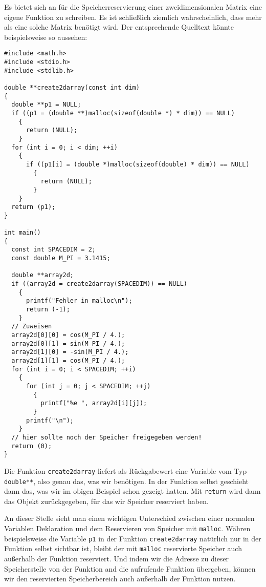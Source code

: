 Es bietet sich an für die Speicherreservierung einer zweidimensionalen Matrix eine eigene Funktion zu schreiben.
Es ist schließlich ziemlich wahrscheinlich, dass mehr als eine solche Matrix benötigt wird.
Der entsprechende Quelltext könnte beispielsweise so aussehen:
\begin{lstlisting}
#include <math.h>
#include <stdio.h>
#include <stdlib.h>

double **create2darray(const int dim)
{
  double **p1 = NULL;
  if ((p1 = (double **)malloc(sizeof(double *) * dim)) == NULL)
    {
      return (NULL);
    }
  for (int i = 0; i < dim; ++i)
    {
      if ((p1[i] = (double *)malloc(sizeof(double) * dim)) == NULL)
        {
          return (NULL);
        }
    }
  return (p1);
}

int main()
{
  const int SPACEDIM = 2;
  const double M_PI = 3.1415;

  double **array2d;
  if ((array2d = create2darray(SPACEDIM)) == NULL)
    {
      printf("Fehler in malloc\n");
      return (-1);
    }
  // Zuweisen
  array2d[0][0] = cos(M_PI / 4.);
  array2d[0][1] = sin(M_PI / 4.);
  array2d[1][0] = -sin(M_PI / 4.);
  array2d[1][1] = cos(M_PI / 4.);
  for (int i = 0; i < SPACEDIM; ++i)
    {
      for (int j = 0; j < SPACEDIM; ++j)
        {
          printf("%e ", array2d[i][j]);
        }
      printf("\n");
    }
  // hier sollte noch der Speicher freigegeben werden!
  return (0);
}
\end{lstlisting}
Die Funktion \verb|create2darray| liefert als Rückgabewert eine Variable vom Typ \verb|double**|, also genau das, was wir benötigen.
In der Funktion selbst geschieht dann das, was wir im obigen Beispiel schon gezeigt hatten.
Mit \verb|return| wird dann das Objekt zurückgegeben, für das wir Speicher reserviert haben.

An dieser Stelle sieht man einen wichtigen Unterschied zwischen einer normalen Variablen Deklaration und dem Reservieren von Speicher mit \verb|malloc|.
Währen beispielsweise die Variable \verb|p1| in der Funktion \verb|create2darray| natürlich nur in der Funktion selbst sichtbar ist, bleibt der mit \verb|malloc| reservierte Speicher auch außerhalb der Funktion reserviert.
Und indem wir die Adresse zu dieser Speicherstelle von der Funktion and die aufrufende Funktion übergeben, können wir den reservierten Speicherbereich auch außerhalb der Funktion nutzen.


